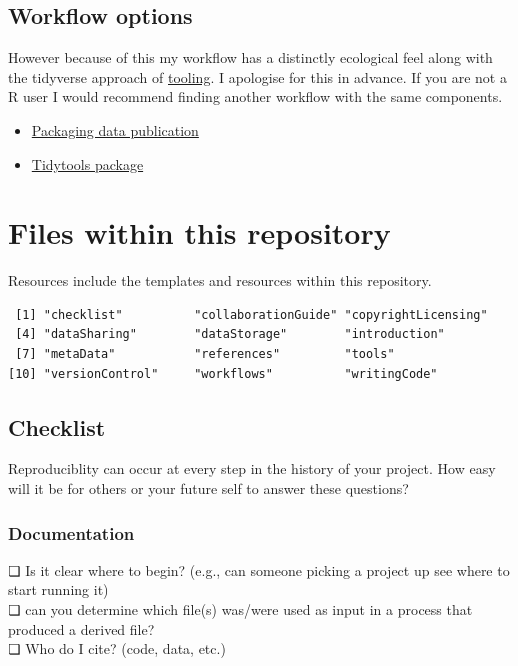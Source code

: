\documentclass[
]{book}
\begin{document}
\hypertarget{workflow-options}{%
\section{Workflow options}\label{workflow-options}}

However because of this my workflow has a distinctly ecological feel along with the tidyverse approach of \href{https://style.tidyverse.org/index.html}{tooling}. I apologise for this in advance. If you are not a R user I would recommend finding another workflow with the same components.

\begin{itemize}
\item
  \href{https://peerj.com/preprints/3192/}{Packaging data publication}
\item
  \href{}{Tidytools package}
\end{itemize}

\hypertarget{files-within-this-repository}{%
\chapter{Files within this repository}\label{files-within-this-repository}}

Resources include the templates and resources within this repository.

\begin{verbatim}
 [1] "checklist"          "collaborationGuide" "copyrightLicensing"
 [4] "dataSharing"        "dataStorage"        "introduction"      
 [7] "metaData"           "references"         "tools"             
[10] "versionControl"     "workflows"          "writingCode"       
\end{verbatim}

\hypertarget{checklist}{%
\section{Checklist}\label{checklist}}

Reproduciblity can occur at every step in the history of your project. How easy will it be for others or your future self to answer these questions?

\hypertarget{documentation}{%
\subsection{Documentation}\label{documentation}}

❏ Is it clear where to begin? (e.g., can someone picking a project up see where to start running it)\\
❏ can you determine which file(s) was/were used as input in a process that produced a derived file?\\
❏ Who do I cite? (code, data, etc.)
\end{document}

